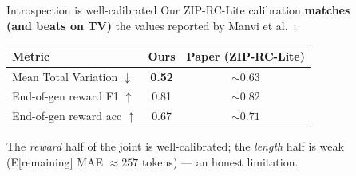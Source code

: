 \documentclass[final]{beamer}
\newlength{\sepwidth}
\newlength{\colwidth}
\newcommand{\separatorcolumn}{\begin{column}{\sepwidth}\end{column}}
\begin{document}
\begin{frame}[t]
\begin{columns}[t]
\begin{column}{\colwidth}
\begin{block}{Introspection is well-calibrated}
    Our ZIP-RC-Lite calibration \textbf{matches (and beats on TV)} the values reported by
    Manvi et al.~\cite{manvi2025zip}:
    \begin{table}
      \centering
      \begin{tabular}{l c c}
        \toprule
        \textbf{Metric} & \textbf{Ours} & \textbf{Paper (ZIP-RC-Lite)} \\
        \midrule
        Mean Total Variation $\downarrow$ & \textbf{0.52} & ${\sim}0.63$ \\
        End-of-gen reward F1 $\uparrow$   & 0.81 & ${\sim}0.82$ \\
        End-of-gen reward acc $\uparrow$  & 0.67 & ${\sim}0.71$ \\
        \bottomrule
      \end{tabular}
    \end{table}
    The \emph{reward} half of the joint is well-calibrated; the \emph{length} half is weak
    (E[remaining] MAE ${\approx}257$ tokens) — an honest limitation.
  \end{block}

\end{column}

\separatorcolumn

\begin{column}{\colwidth}


\end{column}
\end{columns}
\end{frame}
\end{document}
